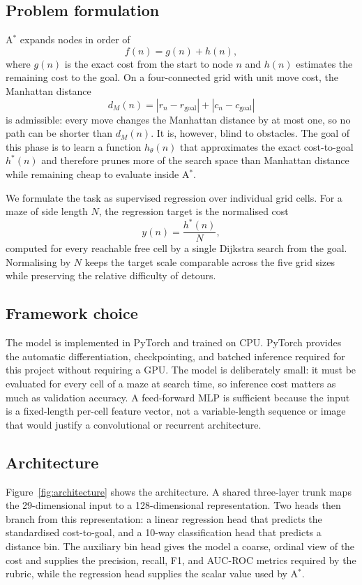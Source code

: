 \documentclass[11pt]{article}
\begin{document}
\subsection{Problem formulation}
A$^\ast$ expands nodes in order of
\begin{equation}
  f(n) = g(n) + h(n),
\end{equation}
where $g(n)$ is the exact cost from the start to node $n$ and $h(n)$ estimates
the remaining cost to the goal. On a four-connected grid with unit move cost,
the Manhattan distance
\begin{equation}
  d_M(n) = |r_n-r_{\text{goal}}| + |c_n-c_{\text{goal}}|
\end{equation}
is admissible: every move changes the Manhattan distance by at most one, so no
path can be shorter than $d_M(n)$. It is, however, blind to obstacles. The goal
of this phase is to learn a function $h_\theta(n)$ that approximates the exact
cost-to-goal $h^\ast(n)$ and therefore prunes more of the search space than
Manhattan distance while remaining cheap to evaluate inside A$^\ast$.

We formulate the task as supervised regression over individual grid cells. For
a maze of side length $N$, the regression target is the normalised cost
\begin{equation}
  y(n) = \frac{h^\ast(n)}{N},
\end{equation}
computed for every reachable free cell by a single Dijkstra search from the
goal. Normalising by $N$ keeps the target scale comparable across the five grid
sizes while preserving the relative difficulty of detours.

\subsection{Framework choice}
The model is implemented in PyTorch and trained on CPU. PyTorch provides the
automatic differentiation, checkpointing, and batched inference required for
this project without requiring a GPU. The model is deliberately small: it must
be evaluated for every cell of a maze at search time, so inference cost matters
as much as validation accuracy. A feed-forward MLP is sufficient because the
input is a fixed-length per-cell feature vector, not a variable-length sequence
or image that would justify a convolutional or recurrent architecture.

\subsection{Architecture}
Figure~\ref{fig:architecture} shows the architecture. A shared three-layer
trunk maps the 29-dimensional input to a 128-dimensional representation. Two
heads then branch from this representation: a linear regression head that
predicts the standardised cost-to-goal, and a 10-way classification head that
predicts a distance bin. The auxiliary bin head gives the model a coarse,
ordinal view of the cost and supplies the precision, recall, F1, and AUC-ROC
metrics required by the rubric, while the regression head supplies the scalar
value used by A$^\ast$.
\end{document}
